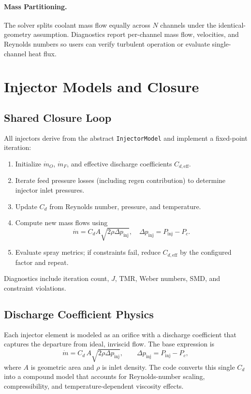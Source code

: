 \documentclass[12pt]{article}
\begin{document}
\paragraph{Mass Partitioning.}  The solver splits coolant mass flow equally across $N$ channels under the identical-geometry assumption.  Diagnostics report per-channel mass flow, velocities, and Reynolds numbers so users can verify turbulent operation or evaluate single-channel heat flux.

\section{Injector Models and Closure}

\subsection{Shared Closure Loop}
All injectors derive from the abstract \verb|InjectorModel| and implement a fixed-point iteration:
\begin{enumerate}
    \item Initialize $\dot{m}_O$, $\dot{m}_F$, and effective discharge coefficients $C_{d,\text{eff}}$.
    \item Iterate feed pressure losses (including regen contribution) to determine injector inlet pressures.
    \item Update $C_d$ from Reynolds number, pressure, and temperature.
    \item Compute new mass flows using
    \[
        \dot{m} = C_d A \sqrt{2 \rho \Delta p_{\text{inj}}}, \quad \Delta p_{\text{inj}} = P_{\text{inj}} - P_c.
    \]
    \item Evaluate spray metrics; if constraints fail, reduce $C_{d,\text{eff}}$ by the configured factor and repeat.
\end{enumerate}
Diagnostics include iteration count, $J$, TMR, Weber numbers, SMD, and constraint violations.

\subsection{Discharge Coefficient Physics}
\label{sec:cd}

Each injector element is modeled as an orifice with a discharge coefficient that captures the departure from ideal, inviscid flow.  The base expression is
\[
\dot{m} = C_d \, A \sqrt{2 \rho \Delta p_{\text{inj}}},
\qquad \Delta p_{\text{inj}} = P_{\text{inj}} - P_c,
\]
where $A$ is geometric area and $\rho$ is inlet density.  The code converts this single $C_d$ into a compound model that accounts for Reynolds-number scaling, compressibility, and temperature-dependent viscosity effects.
\end{document}
